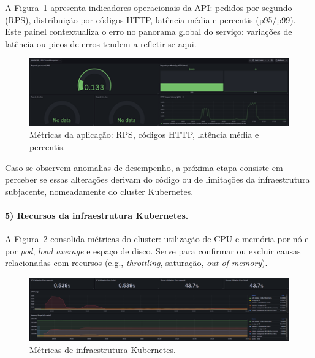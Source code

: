 A Figura~\ref{fig:dash-4} apresenta indicadores operacionais da API: pedidos por segundo (RPS), distribuição por códigos HTTP, latência média e percentis (p95/p99). Este painel contextualiza o erro no panorama global do serviço: variações de latência ou picos de erros tendem a refletir-se aqui.

\begin{figure}[H]
    \centering
    \includegraphics[width=\textwidth]{images/Grafana/metrics_dashboard.png}
    \caption{Métricas da aplicação: RPS, códigos HTTP, latência média e percentis.}
    \label{fig:dash-4}
\end{figure}

Caso se observem anomalias de desempenho, a próxima etapa consiste em perceber se essas 
alterações derivam do código ou de limitações da infraestrutura subjacente, nomeadamente do cluster Kubernetes.



\paragraph{5) Recursos da infraestrutura Kubernetes.}

A Figura~\ref{fig:dash-5} consolida métricas do cluster: utilização de CPU e memória por nó e por \textit{pod}, \textit{load average} e espaço de disco. Serve para confirmar ou excluir causas relacionadas com recursos (e.g., \textit{throttling}, saturação, \textit{out-of-memory}).

\begin{figure}[H]
    \centering
    \includegraphics[width=\textwidth]{images/Grafana/cpu_memory_dashboard.png}
    \caption{Métricas de infraestrutura Kubernetes.}
    \label{fig:dash-5}
\end{figure}

